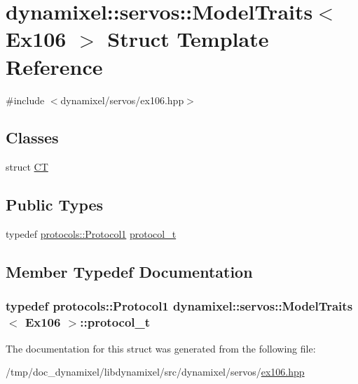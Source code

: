\hypertarget{structdynamixel_1_1servos_1_1_model_traits_3_01_ex106_01_4}{}\section{dynamixel\+:\+:servos\+:\+:Model\+Traits$<$ Ex106 $>$ Struct Template Reference}
\label{structdynamixel_1_1servos_1_1_model_traits_3_01_ex106_01_4}


{\ttfamily \#include $<$dynamixel/servos/ex106.\+hpp$>$}

\subsection*{Classes}
\begin{DoxyCompactItemize}
\item 
struct \hyperlink{structdynamixel_1_1servos_1_1_model_traits_3_01_ex106_01_4_1_1_c_t}{C\+T}
\end{DoxyCompactItemize}
\subsection*{Public Types}
\begin{DoxyCompactItemize}
\item 
typedef \hyperlink{classdynamixel_1_1protocols_1_1_protocol1}{protocols\+::\+Protocol1} \hyperlink{structdynamixel_1_1servos_1_1_model_traits_3_01_ex106_01_4_a86132ee755c36e43ee810156e8a5cba1}{protocol\+\_\+t}
\end{DoxyCompactItemize}


\subsection{Member Typedef Documentation}
\hypertarget{structdynamixel_1_1servos_1_1_model_traits_3_01_ex106_01_4_a86132ee755c36e43ee810156e8a5cba1}{}
\subsubsection[{protocol\+\_\+t}]{\setlength{\rightskip}{0pt plus 5cm}typedef {\bf protocols\+::\+Protocol1} {\bf dynamixel\+::servos\+::\+Model\+Traits}$<$ {\bf Ex106} $>$\+::{\bf protocol\+\_\+t}}\label{structdynamixel_1_1servos_1_1_model_traits_3_01_ex106_01_4_a86132ee755c36e43ee810156e8a5cba1}


The documentation for this struct was generated from the following file\+:\begin{DoxyCompactItemize}
\item 
/tmp/doc\+\_\+dynamixel/libdynamixel/src/dynamixel/servos/\hyperlink{ex106_8hpp}{ex106.\+hpp}\end{DoxyCompactItemize}
